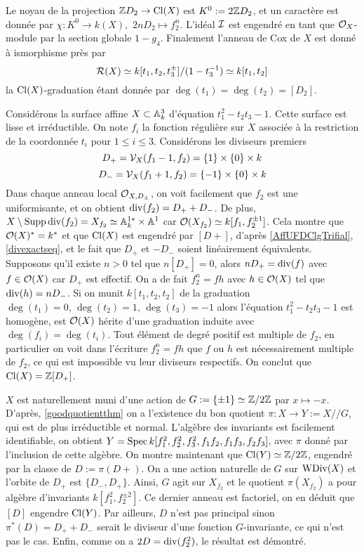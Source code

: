 \begin{ex}
Le noyau de la projection $\mathbb{Z} D_2\rightarrow \operatorname{Cl}(X)$ est $K^0:=2\mathbb{Z} D_2$, et un caractère est donnée par $\chi: K^0\rightarrow k(X),\,\,2nD_2\mapsto f_2^n$. L'idéal $\mathcal{I}$ est engendré en tant que $\mathcal{O}_X$-module par la section globale $1-g_4$. Finalement l'anneau de Cox de $X$ est donné à ismorphisme près par
$$\mathcal{R}(X)\simeq k[t_1,t_2,t_3^{\pm}]/(1-t_3^{-1})\simeq k[t_1,t_2]$$
la $\operatorname{Cl}(X)$-graduation étant donnée par $\deg(t_1)=\deg(t_2)=[D_2]$.
\end{ex}

\begin{ex}\label{CoxRingEx3}
Considérons la surface affine $X\subset \mathbb{A}_k^3$ d'équation $t_1^2-t_2t_3-1$. Cette surface est lisse et irréductible. On note $f_i$ la fonction régulière sur $X$ associée à la restriction de la coordonnée $t_i$ pour $1\leq i\leq 3$. Considérons les diviseurs premiers
$$D_+=\mathcal{V}_X(f_1-1,f_2)=\lbrace 1\rbrace\times\lbrace 0\rbrace\times k$$
$$D_-=\mathcal{V}_X(f_1+1,f_2)=\lbrace -1\rbrace\times\lbrace 0\rbrace\times k$$
Dans chaque anneau local $\mathcal{O}_{X,D_\pm}$, on voit facilement que $f_2$ est une uniformisante, et on obtient $\operatorname{div}(f_2)=D_++D_-$. De plus, $X\setminus\operatorname{Supp} \operatorname{div}(f_2)=X_{f_2}\simeq \mathbb{A}^{1*}_k\times \mathbb{A}^1$ car $\mathcal{O}(X_{f_2})\simeq k[f_1,f_2^{\pm 1}]$. Cela montre que $\mathcal{O}(X)^*=k^*$ et que $\operatorname{Cl}(X)$ est engendré par $[D+]$, d'après \ref{AffUFDClgTrifial}, \ref{divexactseq}, et le fait que $D_+$ et $-D_-$ soient linéairement équivalents. Supposons qu'il existe $n>0$ tel que $n[D_+]=0$, alors $nD_+=\operatorname{div}(f)$ avec $f\in\mathcal{O}(X)$ car $D_+$ est effectif. On a de fait $f_2^n=fh$ avec $h\in\mathcal{O}(X)$ tel que $\operatorname{div}(h)=nD_-$. Si on munit $k[t_1,t_2,t_2]$ de la graduation $\deg(t_1)=0,\,\deg(t_2)=1,\,\deg(t_3)=-1$ alors l'équation $t_1^2-t_2t_3-1$ est homogène, est $\mathcal{O}(X)$ hérite d'une graduation induite avec $\deg(f_i)=\deg(t_i)$. Tout élément de degré positif est multiple de $f_2$, en particulier on voit dans l'écriture $f_2^n=fh$ que $f$ ou $h$ est nécessairement multiple de $f_2$, ce qui est impossible vu leur diviseurs respectifs. On conclut que $\operatorname{Cl}(X)=\mathbb{Z}[D_+]$.

$X$ est naturellement muni d'une action de $G:=\lbrace \pm 1\rbrace\simeq \mathbb{Z}/2\mathbb{Z}$ par $x\mapsto -x$. D'après, \ref{goodquotientthm} on a l'existence du bon quotient $\pi:X\rightarrow Y:=X//G$, qui est de plus irréductible et normal. L'algèbre des invariants est facilement identifiable, on obtient  $Y=\operatorname{Spec} k[f_1^2,f_2^2,f_3^2,f_1f_2,f_1f_3,f_2f_3]$, avec $\pi$ donné par l'inclusion de cette algèbre. On montre maintenant que $\operatorname{Cl}(Y)\simeq \mathbb{Z}/2\mathbb{Z}$, engendré par la classe de $D:=\pi(D+)$. On a une action naturelle de $G$ sur $\operatorname{WDiv}(X)$ et l'orbite de $D_+$ est $\lbrace D_-,D_+\rbrace$. Ainsi, $G$ agit sur $X_{f_2}$ et le quotient $\pi(X_{f_2})$ a pour algèbre d'invariants $k[f_1^2,f_2^{\pm 2}]$. Ce dernier anneau est factoriel, on en déduit que $[D]$ engendre $\operatorname{Cl}(Y)$. Par ailleurs, $D$ n'est pas principal sinon $\pi^*(D)=D_++D_-$ serait le diviseur d'une fonction $G$-invariante, ce qui n'est pas le cas. Enfin, comme on a $2D=\operatorname{div}(f_2^2)$, le résultat est démontré.


\end{ex}
